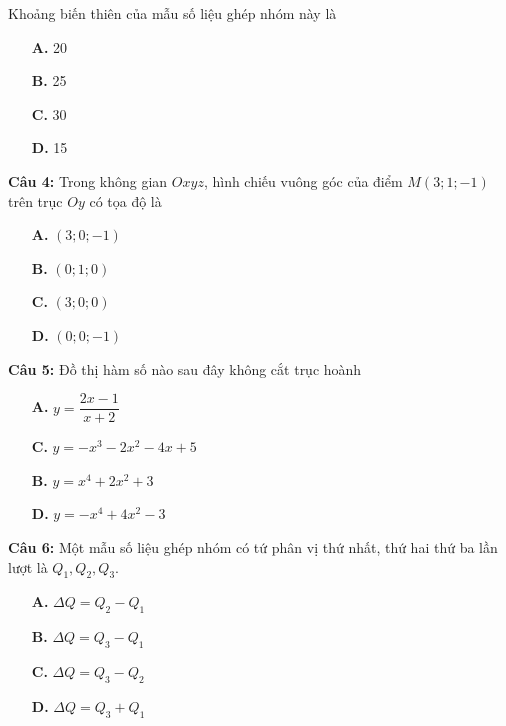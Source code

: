 \documentclass[12pt, a4paper]{article}
\begin{document}
	Khoảng biến thiên của mẫu số liệu ghép nhóm này là
	
	\begin{multicols}{4}
		\begin{enumerate}
			\item[\textbf{A.}] 20
			\item[\textbf{B.}] 25
			\item[\textbf{C.}] 30 
			\item[\textbf{D.}] 15
		\end{enumerate}
	\end{multicols}

\textbf{Câu 4: } Trong không gian $ Oxyz $, hình chiếu vuông góc của điểm $ M(3;1;-1) $ trên trục $ Oy $ có tọa độ là
	\begin{multicols}{4}
		\begin{enumerate}
			\item[\textbf{A.}] $ (3;0;-1) $
			\item[\textbf{B.}] $ (0;1;0) $
			\item[\textbf{C.}] $ (3;0;0) $
			\item[\textbf{D.}] $ (0;0;-1) $
		\end{enumerate}
	\end{multicols}

\pagebreak

\textbf{Câu 5: } Đồ thị hàm số nào sau đây không cắt trục hoành
	\begin{multicols}{2}
		\begin{enumerate}
			\item[\textbf{A.}] $ y = \dfrac{2x - 1}{x + 2} $
			\item[\textbf{C.}] $ y = -x^3 - 2x^2 - 4x + 5 $
			\item[\textbf{B.}] $ y = x^4 + 2x^2 + 3 $
			\item[\textbf{D.}] $ y = -x^4 + 4x^2 - 3 $
		\end{enumerate}
	\end{multicols}

\textbf{Câu 6: } Một mẫu số liệu ghép nhóm có tứ phân vị thứ nhất, thứ hai thứ ba lần lượt là $ Q_1, Q_2, Q_3 $.
	\begin{multicols}{4}
		\begin{enumerate}
			\item[\textbf{A.}] $ \Delta Q = Q_2 - Q_1 $
			\item[\textbf{B.}] $ \Delta Q = Q_3 - Q_1 $
			\item[\textbf{C.}] $ \Delta Q = Q_3 - Q_2 $
			\item[\textbf{D.}] $ \Delta Q = Q_3 + Q_1 $
		\end{enumerate}
	\end{multicols}
\end{document}
